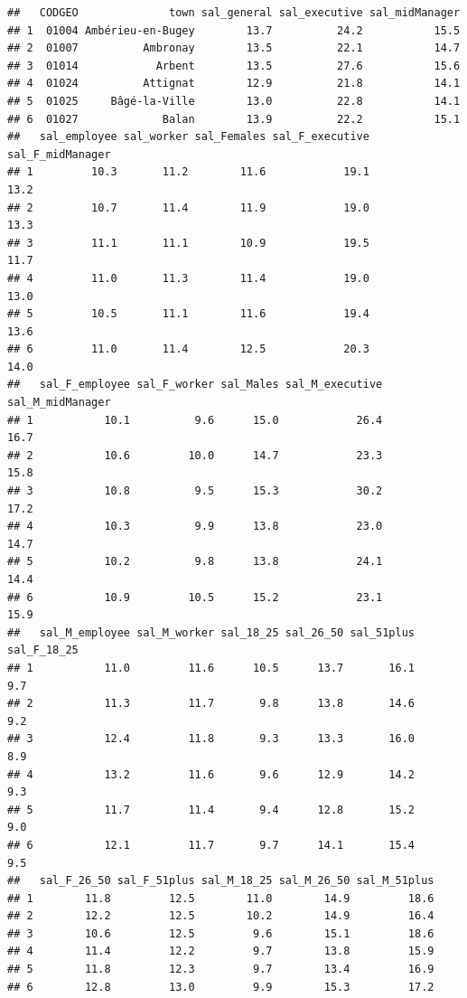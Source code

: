 \documentclass[]{article}
\begin{document}
\begin{verbatim}
##   CODGEO              town sal_general sal_executive sal_midManager
## 1  01004 Ambérieu-en-Bugey        13.7          24.2           15.5
## 2  01007          Ambronay        13.5          22.1           14.7
## 3  01014            Arbent        13.5          27.6           15.6
## 4  01024          Attignat        12.9          21.8           14.1
## 5  01025     Bâgé-la-Ville        13.0          22.8           14.1
## 6  01027             Balan        13.9          22.2           15.1
##   sal_employee sal_worker sal_Females sal_F_executive sal_F_midManager
## 1         10.3       11.2        11.6            19.1             13.2
## 2         10.7       11.4        11.9            19.0             13.3
## 3         11.1       11.1        10.9            19.5             11.7
## 4         11.0       11.3        11.4            19.0             13.0
## 5         10.5       11.1        11.6            19.4             13.6
## 6         11.0       11.4        12.5            20.3             14.0
##   sal_F_employee sal_F_worker sal_Males sal_M_executive sal_M_midManager
## 1           10.1          9.6      15.0            26.4             16.7
## 2           10.6         10.0      14.7            23.3             15.8
## 3           10.8          9.5      15.3            30.2             17.2
## 4           10.3          9.9      13.8            23.0             14.7
## 5           10.2          9.8      13.8            24.1             14.4
## 6           10.9         10.5      15.2            23.1             15.9
##   sal_M_employee sal_M_worker sal_18_25 sal_26_50 sal_51plus sal_F_18_25
## 1           11.0         11.6      10.5      13.7       16.1         9.7
## 2           11.3         11.7       9.8      13.8       14.6         9.2
## 3           12.4         11.8       9.3      13.3       16.0         8.9
## 4           13.2         11.6       9.6      12.9       14.2         9.3
## 5           11.7         11.4       9.4      12.8       15.2         9.0
## 6           12.1         11.7       9.7      14.1       15.4         9.5
##   sal_F_26_50 sal_F_51plus sal_M_18_25 sal_M_26_50 sal_M_51plus
## 1        11.8         12.5        11.0        14.9         18.6
## 2        12.2         12.5        10.2        14.9         16.4
## 3        10.6         12.5         9.6        15.1         18.6
## 4        11.4         12.2         9.7        13.8         15.9
## 5        11.8         12.3         9.7        13.4         16.9
## 6        12.8         13.0         9.9        15.3         17.2
\end{verbatim}
\end{document}
